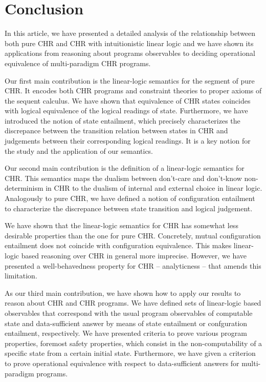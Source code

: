\documentclass[acmtocl]{acmtrans2m}
\begin{document}
\section{Conclusion}
\label{sec:conclusion}

In this article, we have presented a detailed analysis of the relationship
between both pure CHR and CHR with intuitionistic linear logic and we have
shown its applications from reasoning about programs observables to deciding
operational equivalence of multi-paradigm CHR programs.

Our first main contribution is the linear-logic semantics for the segment of pure
CHR. It encodes both CHR programs and constraint theories to proper axioms of the
sequent calculus. We have shown that equivalence of CHR states coincides with
logical equivalence of the logical readings of state. Furthermore, we have
introduced the notion of state entailment, which precisely characterizes the
discrepance between the transition relation between states in CHR and judgements
between their corresponding logical readings. It is a key notion for the study
and the application of our semantics.

Our second main contribution is the definition of a linear-logic semantics for
CHR. This semantics maps the dualism between don't-care and don't-know
non-determinism in CHR to the dualism of internal and external choice in
linear logic. Analogously to pure CHR, we have defined a notion of configuration
entailment to characterize the discrepance between state transition and logical
judgement.

We have shown that the linear-logic semantics for CHR has somewhat less
desirable properties than the one for pure CHR. Concretely, mutual configuration
entailment does not coincide with configuration equivalence. This makes
linear-logic based reasoning over CHR in general more imprecise. However,
we have presented a well-behavedness property for CHR -- analyticness --
that amends this limitation.

As our third main contribution, we have shown how to apply our results to reason
about CHR and CHR programs. We have defined sets of linear-logic based
observables that correspond with the usual program observables of computable
state and data-sufficient answer by means of state entailment or confguration
entailment, respectively. We have presented criteria to prove various program
properties, foremost safety properties, which consist in the non-computability of
a specific state from a certain initial state. Furthermore, we have given a
criterion to prove operational equivalence with respect to data-sufficient
answers for multi-paradigm programs.
\end{document}
